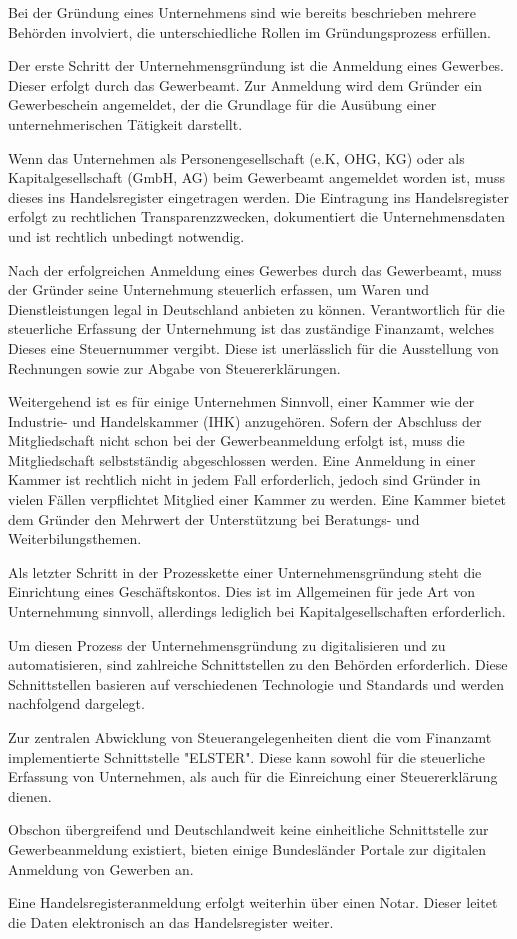
Bei der Gründung eines Unternehmens sind wie bereits beschrieben mehrere Behörden
involviert, die unterschiedliche Rollen im Gründungsprozess erfüllen.

Der erste Schritt der Unternehmensgründung ist die Anmeldung eines Gewerbes. Dieser erfolgt
durch das Gewerbeamt. Zur Anmeldung wird dem Gründer ein Gewerbeschein angemeldet, der die Grundlage
für die Ausübung einer unternehmerischen Tätigkeit darstellt.

Wenn das Unternehmen als Personengesellschaft (e.K, OHG, KG) oder als Kapitalgesellschaft (GmbH, AG)
beim Gewerbeamt angemeldet worden ist, muss dieses ins Handelsregister eingetragen werden. Die Eintragung 
ins Handelsregister erfolgt zu rechtlichen Transparenzzwecken, dokumentiert die Unternehmensdaten und ist rechtlich
unbedingt notwendig.

Nach der erfolgreichen Anmeldung eines Gewerbes durch das Gewerbeamt, muss der Gründer seine Unternehmung 
steuerlich erfassen, um Waren und Dienstleistungen legal in Deutschland anbieten zu können. Verantwortlich für
die steuerliche Erfassung der Unternehmung ist das zuständige Finanzamt, welches Dieses eine Steuernummer vergibt. 
Diese ist unerlässlich für die Ausstellung von Rechnungen sowie zur Abgabe von Steuererklärungen.

Weitergehend ist es für einige Unternehmen Sinnvoll, einer Kammer wie der Industrie- und Handelskammer (IHK) anzugehören.
Sofern der Abschluss der Mitgliedschaft nicht schon bei der Gewerbeanmeldung erfolgt ist, muss die Mitgliedschaft selbstständig
abgeschlossen werden. Eine Anmeldung in einer Kammer ist rechtlich nicht in jedem Fall erforderlich, jedoch sind Gründer in vielen 
Fällen verpflichtet Mitglied einer Kammer zu werden. Eine Kammer bietet dem Gründer den Mehrwert der Unterstützung bei Beratungs- und Weiterbilungsthemen.

Als letzter Schritt in der Prozesskette einer Unternehmensgründung steht die Einrichtung eines Geschäftskontos. Dies ist im Allgemeinen
für jede Art von Unternehmung sinnvoll, allerdings lediglich bei Kapitalgesellschaften erforderlich.

Um diesen Prozess der Unternehmensgründung zu digitalisieren und zu automatisieren, sind zahlreiche Schnittstellen zu den Behörden erforderlich.
Diese Schnittstellen basieren auf verschiedenen Technologie und Standards und werden nachfolgend dargelegt.

Zur zentralen Abwicklung von Steuerangelegenheiten dient die vom Finanzamt implementierte Schnittstelle "ELSTER".
Diese kann sowohl für die steuerliche Erfassung von Unternehmen, als auch für die Einreichung einer Steuererklärung dienen.

Obschon übergreifend und Deutschlandweit keine einheitliche Schnittstelle zur Gewerbeanmeldung existiert, 
bieten einige Bundesländer Portale zur digitalen Anmeldung von Gewerben an. 

Eine Handelsregisteranmeldung erfolgt weiterhin über einen Notar. Dieser leitet die Daten elektronisch an das Handelsregister weiter.


